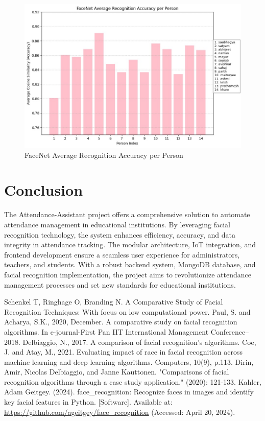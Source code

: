 \documentclass[conference]{IEEEtran}
\begin{document}
\begin{figure}[h]
    \centering
    \includegraphics[width=.45\textwidth]{FaceNet.jpg}
    \caption{FaceNet Average Recognition Accuracy per Person}
    \label{fig:FaceNet Average Recognition Accuracy per Person}
\end{figure}

\section{Conclusion}
The Attendance-Assistant project offers a comprehensive solution to automate attendance management in educational institutions. By leveraging facial recognition technology, the system enhances efficiency, accuracy, and data integrity in attendance tracking. The modular architecture, IoT integration, and frontend development ensure a seamless user experience for administrators, teachers, and students. With a robust backend system, MongoDB database, and facial recognition implementation, the project aims to revolutionize attendance management processes and set new standards for educational institutions.

\begin{thebibliography}{00}
    Schenkel T, Ringhage O, Branding N. A Comparative Study of Facial Recognition Techniques: With focus on low computational power.
    Paul, S. and Acharya, S.K., 2020, December. A comparative study on facial recognition algorithms. In e-journal-First Pan IIT International Management Conference–2018.
    Delbiaggio, N., 2017. A comparison of facial recognition’s algorithms.
    Coe, J. and Atay, M., 2021. Evaluating impact of race in facial recognition across machine learning and deep learning algorithms. Computers, 10(9), p.113.
    Dirin, Amir, Nicolas Delbiaggio, and Janne Kauttonen. "Comparisons of facial recognition algorithms through a case study application." (2020): 121-133.
    Kahler, Adam Geitgey. (2024). face\_recognition: Recognize faces in images and identify key facial features in Python. [Software]. Available at: \url{https://github.com/ageitgey/face_recognition} (Accessed: April 20, 2024).

\end{thebibliography}
\end{document}
